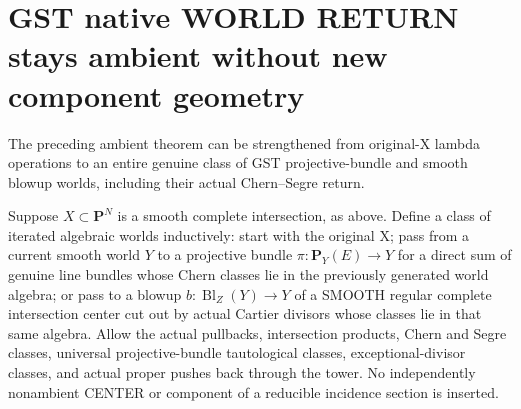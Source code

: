 \documentclass[11pt]{article}
\begin{document}
\section{GST native WORLD RETURN stays ambient without new component geometry}
The preceding ambient theorem can be strengthened from original-X
lambda operations to an entire genuine class of GST
projective-bundle and smooth blowup worlds, including
their actual Chern--Segre return.

Suppose \(X\subset\mathbf P^N\) is a smooth complete
intersection, as above. Define a class of iterated algebraic
worlds inductively: start with the original X;
pass from a current smooth world \(Y\) to a
projective bundle \(\pi:\mathbf P_Y(E)\to Y\)
for a direct sum of genuine line bundles whose Chern
classes lie in the previously generated world algebra;
or pass to a blowup \(b:\operatorname{Bl}_Z(Y)\to Y\)
of a SMOOTH regular complete intersection center
cut out by actual Cartier divisors whose classes
lie in that same algebra.
Allow the actual pullbacks, intersection products,
Chern and Segre classes, universal projective-bundle
tautological classes, exceptional-divisor classes,
and actual proper pushes back through the tower.
No independently nonambient CENTER or component of
a reducible incidence section is inserted.
\end{document}
